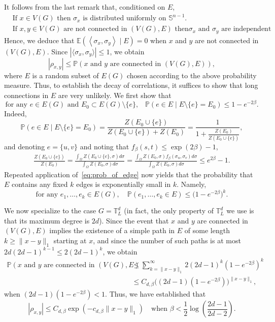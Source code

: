 \documentclass[12pt,reqno]{article}
\def\E{\mathbb{E}}
\def\T{\mathbb{T}}
\renewcommand{\S}{\mathbb{S}}
\renewcommand{\Pr}{\mathbb{P}}
\begin{document}
It follows from the last remark that, conditioned on $E$,
\begin{align*}
&\text{If $x \in V(G)$ then $\sigma_x$ is distributed uniformly on $\S^{n-1}$} .\\
&\text{If $x,y \in V(G)$ are not connected in $(V(G),E)$ then
$\sigma_x$ and $\sigma_y$ are independent}.
\end{align*}
Hence, we deduce that $\E(\left\langle\sigma_x,\sigma_y\right\rangle \mid E)=0$
when $x$ and $y$ are not connected in $(V(G),E)$. Since
$|\langle\sigma_x,\sigma_y\rangle| \le 1$, we obtain
\[ |\rho_{x,y}| \le \Pr(\text{$x$ and $y$ are connected in $(V(G),E)$}) ,\]
where $E$ is a random subset of $E(G)$ chosen according to the above
probability measure. Thus, to establish the decay of correlations,
it suffices to show that long connections in $E$ are very unlikely. We
first show that
\begin{equation}\label{eq:prob_of_edge}
\text{for any $e \in E(G)$ and $E_0 \subset E(G) \setminus \{e\}$,
}\quad\Pr(e \in E \mid E \setminus \{e\} = E_0) \le 1 - e^{-2\beta} .
\end{equation}
Indeed,
\[ \Pr(e \in E \mid E \setminus \{e\} = E_0)
 = \frac{Z(E_0 \cup \{e\})}{Z(E_0 \cup \{e\}) + Z(E_0)} = \frac{1}{1 + \frac{Z(E_0)}{Z(E_0 \cup \{e\})}} ,\]
and denoting $e=\{u,v\}$ and noting that $f_\beta(s,t) \le \exp(2\beta) - 1$,
\begin{align*}
\frac{Z(E_0 \cup \{e\})}{Z(E_0)}
 = \frac{\int_{\Omega} Z(E_0 \cup \{e\},\sigma) d\sigma}{\int_{\Omega} Z(E_0,\sigma) d\sigma}
 = \frac{\int_{\Omega} Z(E_0,\sigma) f_\beta(\sigma_u,\sigma_v) d\sigma}{\int_{\Omega} Z(E_0,\sigma) d\sigma}
 \le e^{2\beta} - 1 .
\end{align*}
Repeated application of~\eqref{eq:prob_of_edge} now yields that the
probability that $E$ contains any fixed $k$ edges is exponentially
small in $k$. Namely,
\[ \text{for any }e_1,\dots,e_k \in E(G),\quad \Pr(e_1,\dots,e_k \in E) \le \big(1 - e^{-2\beta} \big)^k .\]


We now specialize to the case $G = \T_L^d$ (in fact, the only property of $\T_L^d$ we use is that its maximum degree is $2d$).
Since the event that $x$ and $y$ are connected in $(V(G),E)$ implies
the existence of a simple path in $E$ of some length $k \ge \|x-y\|_1$ starting at
$x$, and since the number of such paths is at most
$2d(2d-1)^{k-1} \le 2(2d-1)^k$, we obtain
\begin{align*}
\Pr(\text{$x$ and $y$ are connected in $(V(G),E)$})
 &\le \sum_{k=\|x-y\|_1}^\infty 2(2d-1)^k (1 - e^{-2\beta})^k \\
 &\le C_{d,\beta} \Big((2d-1) (1 - e^{-2\beta})\Big)^{\|x-y\|_1} ,
\end{align*}
when $(2d-1) (1 - e^{-2\beta}) < 1$. Thus, we have established that
\[ |\rho_{x,y}| \le C_{d,\beta} \exp\left( -c_{d,\beta} \|x-y\|_1 \right) \quad\text{when }\beta < \frac{1}{2} \log \left( \frac{2d-1}{2d-2} \right) .\]
\end{document}
